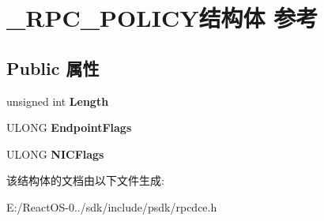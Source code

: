 \hypertarget{struct___r_p_c___p_o_l_i_c_y}{}\section{\+\_\+\+R\+P\+C\+\_\+\+P\+O\+L\+I\+C\+Y结构体 参考}
\label{struct___r_p_c___p_o_l_i_c_y}
\subsection*{Public 属性}
\begin{DoxyCompactItemize}
\item 
\mbox{\label{struct___r_p_c___p_o_l_i_c_y_a3493deef4596a4e02fe3b0eda03a401a}} 
unsigned int {\bfseries Length}
\item 
\mbox{\label{struct___r_p_c___p_o_l_i_c_y_a53b91ff010b9261b9ceaf70260794776}} 
U\+L\+O\+NG {\bfseries Endpoint\+Flags}
\item 
\mbox{\label{struct___r_p_c___p_o_l_i_c_y_ac245e57da1c364f00855a2b00a6f7b58}} 
U\+L\+O\+NG {\bfseries N\+I\+C\+Flags}
\end{DoxyCompactItemize}


该结构体的文档由以下文件生成\+:\begin{DoxyCompactItemize}
\item 
E\+:/\+React\+O\+S-\/0../sdk/include/psdk/rpcdce.\+h\end{DoxyCompactItemize}
